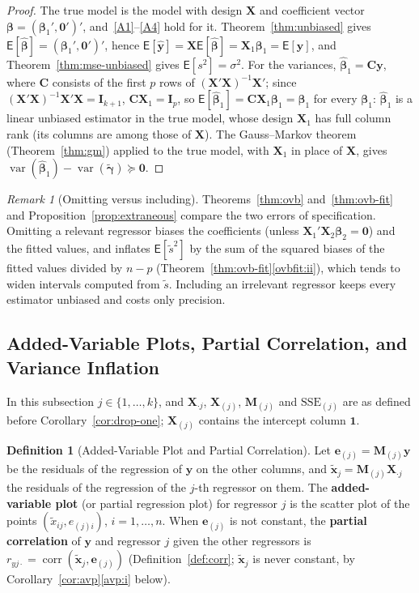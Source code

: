 \documentclass[14pt]{extarticle}
\theoremstyle{plain}
\theoremstyle{definition}
\newtheorem{definition}[theorem]{Definition}
\theoremstyle{remark}
\newtheorem{remark}[theorem]{Remark}
\newcommand\expc{\mathsf{E}}
\DeclareMathOperator\var{var}
\DeclareMathOperator\corr{corr}
\newcommand{\SSE}{\mathrm{SSE}}
\newcommand{\bX}{\mathbf{X}}
\newcommand{\by}{\mathbf{y}}
\newcommand{\bx}{\mathbf{x}}
\def\bb{\boldsymbol{\beta}}
\newcommand{\bI}{\mathbf{I}}
\newcommand{\bM}{\mathbf{M}}
\newcommand{\bone}{\mathbf{1}}
\newcommand{\bzero}{\mathbf{0}}
\newcommand{\bC}{\mathbf{C}}
\begin{document}
\begin{proof}
The true model is the model with design $\bX$ and coefficient vector $\bb = (\bb_1', \bzero')'$, and~\ref{A1}--\ref{A4} hold for it. Theorem~\ref{thm:unbiased} gives $\expc[\hat{\bb}] = (\bb_1', \bzero')'$, hence $\expc[\hat{\by}] = \bX\expc[\hat{\bb}] = \bX_1\bb_1 = \expc[\by]$, and Theorem~\ref{thm:mse-unbiased} gives $\expc[s^2] = \sigma^2$. For the variances, $\hat{\bb}_1 = \bC\by$, where $\bC$ consists of the first $p$ rows of $(\bX'\bX)^{-1}\bX'$; since $(\bX'\bX)^{-1}\bX'\bX = \bI_{k+1}$, $\bC\bX_1 = \bI_p$, so $\expc[\hat{\bb}_1] = \bC\bX_1\bb_1 = \bb_1$ for every $\bb_1$: $\hat{\bb}_1$ is a linear unbiased estimator in the true model, whose design $\bX_1$ has full column rank (its columns are among those of $\bX$). The Gauss--Markov theorem (Theorem~\ref{thm:gm}) applied to the true model, with $\bX_1$ in place of $\bX$, gives $\var(\hat{\bb}_1) - \var(\tilde{\boldsymbol\gamma}) \succeq \bzero$.
\end{proof}

\begin{remark}[Omitting versus including]\label{rem:omit-include}
Theorems~\ref{thm:ovb} and~\ref{thm:ovb-fit} and Proposition~\ref{prop:extraneous} compare the two errors of specification. Omitting a relevant regressor biases the coefficients (unless $\bX_1'\bX_2\bb_2 = \bzero$) and the fitted values, and inflates $\expc[\tilde s^2]$ by the sum of the squared biases of the fitted values divided by $n - p$ (Theorem~\ref{thm:ovb-fit}\ref{ovbfit:ii}), which tends to widen intervals computed from $\tilde s$. Including an irrelevant regressor keeps every estimator unbiased and costs only precision.
\end{remark}

\subsection{Added-Variable Plots, Partial Correlation, and Variance Inflation}

In this subsection $j \in \{1, \ldots, k\}$, and $\bX_{\cdot j}$, $\bX_{(j)}$, $\bM_{(j)}$ and $\SSE_{(j)}$ are as defined before Corollary~\ref{cor:drop-one}; $\bX_{(j)}$ contains the intercept column $\bone$.

\begin{definition}[Added-Variable Plot and Partial Correlation]\label{def:avp}
Let $\mathbf{e}_{(j)} = \bM_{(j)}\by$ be the residuals of the regression of $\by$ on the other columns, and $\tilde{\bx}_j = \bM_{(j)}\bX_{\cdot j}$ the residuals of the regression of the $j$-th regressor on them. The \textbf{added-variable plot} (or partial regression plot) for regressor $j$ is the scatter plot of the points $(\tilde x_{ij}, e_{(j)i})$, $i = 1, \ldots, n$. When $\mathbf{e}_{(j)}$ is not constant, the \textbf{partial correlation} of $\by$ and regressor $j$ given the other regressors is $r_{yj\cdot} = \corr(\tilde{\bx}_j, \mathbf{e}_{(j)})$ (Definition~\ref{def:corr}; $\tilde{\bx}_j$ is never constant, by Corollary~\ref{cor:avp}\ref{avp:i} below).
\end{definition}
\end{document}
